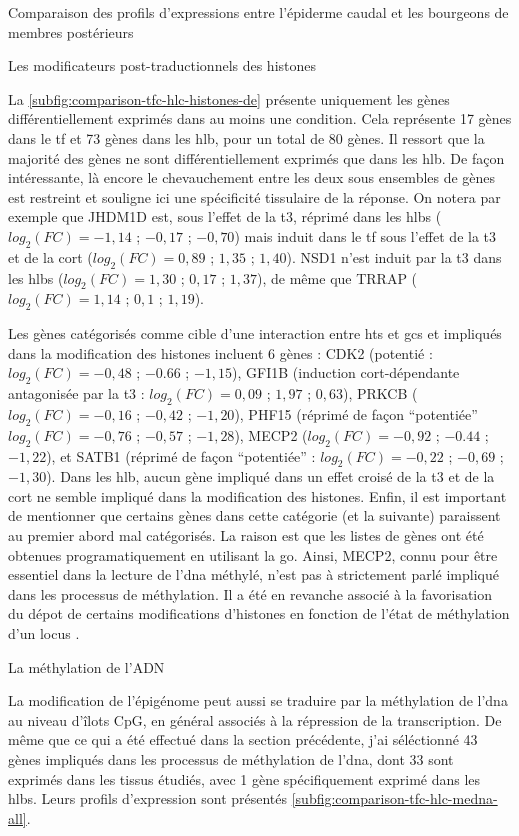 \documentclass[../main.tex]{subfiles}
\begin{document}
\begin{chapter}{Comparaison des profils d'expressions entre l'épiderme caudal et les bourgeons de membres postérieurs}
\begin{section}{Les modificateurs post-traductionnels des histones}


La \autoref{subfig:comparison-tfc-hlc-histones-de} présente uniquement les gènes différentiellement exprimés dans au moins une condition.
Cela représente 17 gènes dans le \gls{tf} et 73 gènes dans les \gls{hlb}, pour un total de 80 gènes.
Il ressort que la majorité des gènes ne sont différentiellement exprimés que dans les \gls{hlb}.
De façon intéressante, là encore le chevauchement entre les deux sous ensembles de gènes est restreint et souligne ici une spécificité tissulaire de la réponse.
On notera par exemple que JHDM1D est, sous l'effet de la \gls{t3}, réprimé dans les \glspl{hlb} ($log_2(FC)=-1,14$ ; $-0,17$ ; $-0,70$) mais induit dans le \gls{tf} sous l'effet de la \gls{t3} et de la \gls{cort} ($log_2(FC)=0,89$ ; $1,35$ ; $1,40$).
NSD1 n'est induit par la \gls{t3} dans les \glspl{hlb} ($log_2(FC)=1,30$ ; $0,17$ ; $1,37$), de même que TRRAP ($log_2(FC)=1,14$ ; $0,1$ ; $1,19$).
\par
Les gènes catégorisés comme cible d'une interaction entre \glspl{ht} et \glspl{gc} et impliqués dans la modification des histones incluent 6 gènes :
CDK2 (potentié : $log_2(FC)=-0,48$ ; $-0.66$ ; $-1,15$), GFI1B (induction \gls{cort}-dépendante antagonisée par la \gls{t3} : $log_2(FC)=0,09$ ; $1,97$ ; $0,63$), PRKCB ($log_2(FC)=-0,16$ ; $-0,42$ ; $-1,20$), PHF15 (réprimé de façon ``potentiée'' $log_2(FC)=-0,76$ ; $-0,57$ ; $-1,28$), MECP2 ($log_2(FC)=-0,92$ ; $-0.44$ ; $-1,22$),  et SATB1 (réprimé de façon ``potentiée'' : $log_2(FC)=-0,22$ ; $-0,69$ ; $-1,30$).
Dans les \gls{hlb}, aucun gène impliqué dans un effet croisé de la \gls{t3} et de la \gls{cort} ne semble impliqué dans la modification des histones.
Enfin, il est important de mentionner que certains gènes dans cette catégorie (et la suivante) paraissent au premier abord mal catégorisés.
La raison est que les listes de gènes ont été obtenues programatiquement en utilisant la \gls{go}.
Ainsi, MECP2, connu pour être essentiel dans la lecture de l'\gls{dna} méthylé, n'est pas à strictement parlé impliqué dans les processus de méthylation.
Il a été en revanche associé à la favorisation du dépot de certains modifications d'histones en fonction de l'état de méthylation d'un locus \citep{Fuks2003}.

\end{section}


\begin{section}{La méthylation de l'ADN}

La modification de l'épigénome peut aussi se traduire par la méthylation de l'\gls{dna} au niveau d'îlots CpG, en général associés à la répression de la transcription.
De même que ce qui a été effectué dans la section précédente, j'ai séléctionné 43 gènes impliqués dans les processus de méthylation de l'\gls{dna}, dont 33 sont exprimés dans les tissus étudiés, avec 1 gène spécifiquement exprimé dans les \glspl{hlb}.
Leurs profils d'expression sont présentés \autoref{subfig:comparison-tfc-hlc-medna-all}.


\end{section}
\end{chapter}
\end{document}
